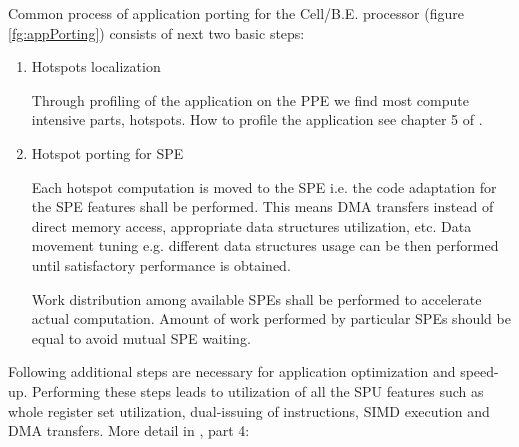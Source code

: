 Common process of application porting for the \mbox{Cell/B.E.} processor (figure \ref{fg:appPorting}) consists of next two basic steps:
\begin{enumerate}
\item Hotspots localization
\par
Through profiling of the application on the PPE we find most compute intensive parts, hotspots.
How to profile the application see chapter 5 of \cite{programmersGuide}.\\

\item Hotspot porting for SPE
\par
Each hotspot computation is moved to the SPE i.e. the code adaptation for the SPE features shall be performed.
This means DMA transfers instead of direct memory access, appropriate data structures utilization, etc.
Data movement tuning e.g. different data structures usage can be then performed until satisfactory performance is obtained.

\par
Work distribution among available SPEs shall be performed to accelerate actual computation.
Amount of work performed by particular SPEs should be equal to avoid mutual SPE waiting.
\end{enumerate}

\par
Following additional steps are necessary for application optimization and speed-up.
Performing these steps leads to utilization of all the SPU features such as whole register set utilization, dual-issuing of instructions, SIMD execution and DMA transfers.
More detail in \cite{writingPerfApps}, part 4:

